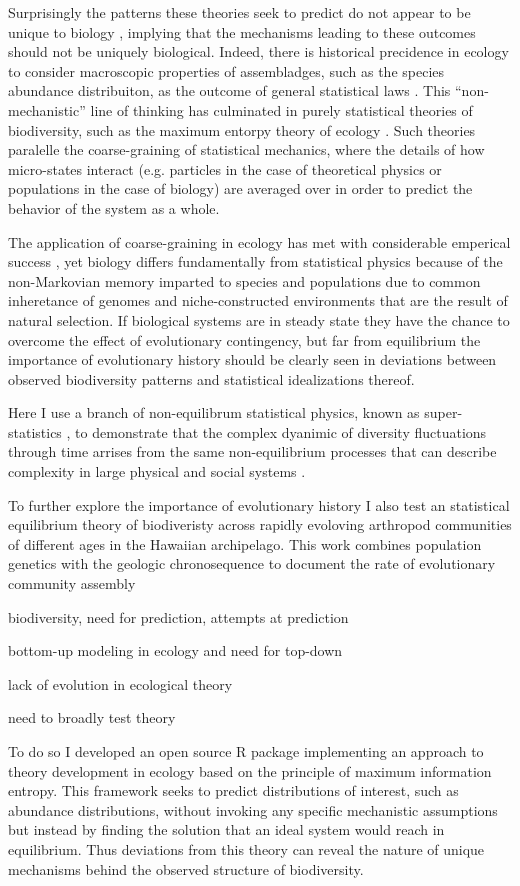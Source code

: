 Surprisingly the patterns these theories seek to predict do not appear
to be unique to biology \citep{nekola}, implying that the mechanisms
leading to these outcomes should not be uniquely biological.  Indeed,
there is historical precidence in ecology to consider macroscopic
properties of assembladges, such as the species abundance
distribuiton, as the outcome of general statistical laws
\citep{fisher, preston, mcgill}. This ``non-mechanistic'' line of
thinking has culminated in purely statistical theories of
biodiversity, such as the maximum entorpy theory of ecology
\citep{harte2011}. Such theories paralelle the coarse-graining of
statistical mechanics, where the details of how micro-states interact
(e.g. particles in the case of theoretical physics or populations in
the case of biology) are averaged over in order to predict the
behavior of the system as a whole.

The application of coarse-graining in ecology has met with
considerable emperical success \citep[e.g.][]{harte2011, others}, yet
biology differs fundamentally from statistical physics because of the
non-Markovian memory imparted to species and populations due to common
inheretance of genomes and niche-constructed environments
\citep{nicheCons} that are the result of natural selection.  If
biological systems are in steady state they have the chance to
overcome the effect of evolutionary contingency, but far from
equilibrium the importance of evolutionary history should be clearly
seen in deviations between observed biodiversity patterns and
statistical idealizations thereof.

Here I use a branch of non-equilibrum statistical physics, known as
super-statistics \citep{beck}, to demonstrate that the complex
dyanimic of diversity fluctuations through time arrises from the same
non-equilibrium processes that can describe complexity in large
physical \cite{beck2004} and social systems \cite{fuentes2009}. 

To further explore the importance of evolutionary history I also test
an statistical equilibrium theory of biodiveristy \citep[the maximum
entropy theory of ecology][]{harte2011} across rapidly evoloving
arthropod communities of different ages in the Hawaiian
archipelago. This work combines population genetics with the geologic
chronosequence to document the rate of evolutionary community assembly 

biodiversity, need for prediction, attempts at prediction

bottom-up modeling in ecology and need for top-down

lack of evolution in ecological theory

need to broadly test theory


To do so I developed an open source R package
implementing an approach to theory development in ecology based on the
principle of maximum information entropy. This framework seeks to
predict distributions of interest, such as abundance distributions,
without invoking any specific mechanistic assumptions but instead by
finding the solution that an ideal system would reach in equilibrium.
Thus deviations from this theory can reveal the nature of unique
mechanisms behind the observed structure of biodiversity. 




